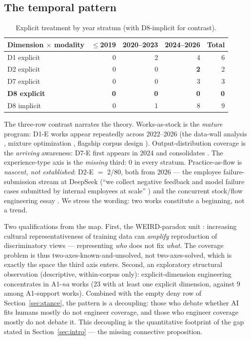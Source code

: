 \documentclass[10pt]{article}
\begin{document}
\subsection{The temporal pattern}\label{sec:temporal}

\begin{table}[t]
\centering
\caption{Explicit treatment by year stratum (with D8-implicit for contrast).}
\label{tab:temporal}
\begin{tabular}{lrrrr}
\toprule
Dimension $\times$ modality & $\leq$2019 & 2020--2023 & 2024--2026 & Total \\
\midrule
D1 explicit       & 0 & 2 & 4 & 6 \\
D2 explicit       & 0 & 0 & \textbf{2} & 2 \\
D7 explicit       & 0 & 0 & 3 & 3 \\
\textbf{D8 explicit} & \textbf{0} & \textbf{0} & \textbf{0} & \textbf{0} \\
D8 implicit       & 0 & 1 & 8 & 9 \\
\bottomrule
\end{tabular}
\end{table}

The three-row contrast narrates the theory. Works-as-stock is the \emph{mature} program: D1-E works appear repeatedly across 2022--2026 (the data-wall analysis \cite{villalobos2022data}, mixture optimization \cite{xie2023doremi, ye2024data}, flagship corpus design \cite{grattafiori2024llama3, penedo2024fineweb}). Output-distribution coverage is the \emph{arriving} awareness: D7-E first appears in 2024 \cite{shumailov2024collapse} and consolidates \cite{jiang2025hivemind, sorensen2025spectrum}. The experience-type axis is the \emph{missing} third: 0 in every stratum. Practice-as-flow is \emph{nascent, not established}: D2-E $=$ 2/80, both from 2026 --- the employee failure-submission stream at DeepSeek (``we collect negative feedback and model failure cases submitted by internal employees at scale'' \cite{deepseek2026v41}) and the concurrent stock/flow engineering essay \cite{gharbi2026model}. We stress the wording: two works constitute a beginning, not a trend.

Two qualifications from the map. First, the WEIRD-paradox unit \cite{zhou2025should}: increasing cultural representativeness of training data can \emph{amplify} reproduction of discriminatory views --- representing \emph{who} does not fix \emph{what}. The coverage problem is thus two-axes-known-and-unsolved, not two-axes-solved, which is exactly the space the third axis enters. Second, an exploratory structural observation (descriptive, within-corpus only): explicit-dimension engineering concentrates in A1-\emph{na} works (23 with at least one explicit dimension, against 9 among A1-support works). Combined with the empty deny row of Section~\ref{sec:stance}, the pattern is a decoupling: those who debate whether AI fits humans mostly do not engineer coverage, and those who engineer coverage mostly do not debate it. This decoupling is the quantitative footprint of the gap stated in Section~\ref{sec:intro} --- the missing connective proposition.
\end{document}
